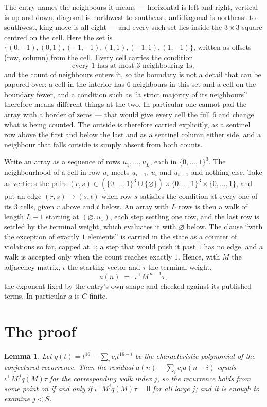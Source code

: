 \documentclass[11pt,a4paper]{article}
\theoremstyle{plain}
\newtheorem{lemma}[theorem]{Lemma}
\theoremstyle{definition}
\begin{document}
The entry names the neighbours it means --- horizontal is left and right, vertical is up and
down, diagonal is northwest-to-southeast, antidiagonal is northeast-to-southwest, king-move is
all eight --- and every such set lies inside the $3\times3$ square centred on the cell. Here
the set is $\{(0,-1), (0,1), (-1,-1), (1,1), (-1,1), (1,-1)\}$, written as offsets (row, column) from the cell. Every cell carries
the condition
\[
\text{every 1 has at most 3 neighbouring 1s},
\]
and the count of neighbours enters it, so the boundary is not a detail that can be papered
over: a cell in the interior has $6$ neighbours in this set and a cell on the boundary
fewer, and a condition such as ``a strict majority of its neighbours'' therefore means
different things at the two. In particular one cannot pad the array with a border of zeros ---
that would give every cell the full $6$ and change what is being counted. The outside is
therefore carried
explicitly, as a sentinel row above the first and below the last and as a sentinel column
either side, and a neighbour that falls outside is simply absent from both counts.

Write an array as a sequence of rows $u_1,\dots,u_L$, each in
$\{0,\dots,1\}^{3}$. The neighbourhood of a cell in row $u_i$ meets $u_{i-1}$,
$u_i$ and $u_{i+1}$ and nothing else. Take as vertices the pairs
$(r,s)\in(\{0,\dots,1\}^{3}\cup\{\varnothing\})\times\{0,\dots,1\}^{3} \times \{0,\dots,1\}$,
and put an edge $(r,s)\to(s,t)$ when row $s$ satisfies the condition at every one of its
$3$ cells, given $r$ above and $t$ below. An array with $L$ rows is then a walk of length
$L-1$ starting at $(\varnothing,u_1)$, each step settling one row, and the last row is
settled by the terminal weight, which evaluates it with $\varnothing$ below. The clause ``with the exception of exactly $1$ elements'' is carried in
the state as a counter of violations so far, capped at $1$; a step that would push it past
$1$ has no edge, and a walk is accepted only when the count reaches exactly $1$. Hence,
with $M$ the adjacency matrix, $\iota$ the starting vector and $\tau$ the terminal weight,
\[
a(n)\;=\;\,\iota^{\!\top}M^{\,n-1}\tau ,
\]
the exponent fixed by the entry's own shape and checked against its published terms. In
particular $a$ is $C$-finite.

\section{The proof}

\begin{lemma}\label{lem:crit}
Let $q(t)=t^{16}-\sum_i c_it^{16-i}$ be the characteristic polynomial of the
conjectured recurrence. Then the residual $a(n)-\sum_ic_ia(n-i)$ equals
$\iota^{\!\top}M^{\,j}q(M)\tau$ for the corresponding walk index $j$, so the
recurrence holds from some point on if and only if $\iota^{\!\top}M^{j}q(M)\tau=0$ for all
large $j$; and it is enough to examine $j<S$.
\end{lemma}
\end{document}
